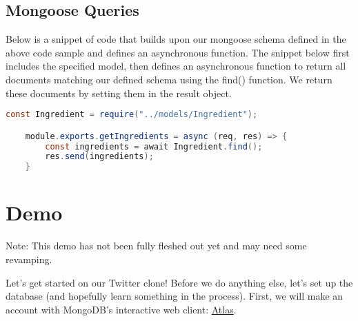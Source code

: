 \subsection*{Mongoose Queries}

Below is a snippet of code that builds upon our mongoose schema defined in the above code sample and defines an asynchronous function. The snippet below first includes the specified model, then defines an asynchronous function to return all documents matching our defined schema using the find() function. We return these documents by setting them in the result object.

\begin{lstlisting}[language=Java]
    const Ingredient = require("../models/Ingredient");

    module.exports.getIngredients = async (req, res) => {
        const ingredients = await Ingredient.find();
        res.send(ingredients);
    }
\end{lstlisting}
    
\section{Demo}

Note: This demo has not been fully fleshed out yet and may need some revamping.

Let's get started on our Twitter clone! Before we do anything else, let's set up the database (and hopefully learn something in the process). First, we will make an account with MongoDB's interactive web client: \href{https://cloud.mongodb.com/}{Atlas}.

